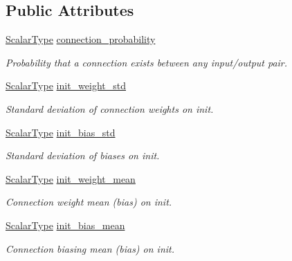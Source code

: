 \subsection*{Public Attributes}
\begin{DoxyCompactItemize}
\item 
\hyperlink{classffnn_1_1layer_1_1internal_1_1_interface_a7f834e3365e5199bcbcd16d9abd63941}{Scalar\-Type} \hyperlink{structffnn_1_1layer_1_1_sparsely_connected_1_1_parameters_a81458846f7bd4ebdfd0b630cfecd7df0}{connection\-\_\-probability}
\begin{DoxyCompactList}\small\item\em Probability that a connection exists between any input/output pair. \end{DoxyCompactList}\item 
\hyperlink{classffnn_1_1layer_1_1internal_1_1_interface_a7f834e3365e5199bcbcd16d9abd63941}{Scalar\-Type} \hyperlink{structffnn_1_1layer_1_1_sparsely_connected_1_1_parameters_a50317b12cecff8ce1b6fa82874b28372}{init\-\_\-weight\-\_\-std}
\begin{DoxyCompactList}\small\item\em Standard deviation of connection weights on init. \end{DoxyCompactList}\item 
\hyperlink{classffnn_1_1layer_1_1internal_1_1_interface_a7f834e3365e5199bcbcd16d9abd63941}{Scalar\-Type} \hyperlink{structffnn_1_1layer_1_1_sparsely_connected_1_1_parameters_a1519128b112ea0cf4a4d021c363bb48c}{init\-\_\-bias\-\_\-std}
\begin{DoxyCompactList}\small\item\em Standard deviation of biases on init. \end{DoxyCompactList}\item 
\hyperlink{classffnn_1_1layer_1_1internal_1_1_interface_a7f834e3365e5199bcbcd16d9abd63941}{Scalar\-Type} \hyperlink{structffnn_1_1layer_1_1_sparsely_connected_1_1_parameters_a46e27cf05911e23f508a3447284fd3c7}{init\-\_\-weight\-\_\-mean}
\begin{DoxyCompactList}\small\item\em Connection weight mean (bias) on init. \end{DoxyCompactList}\item 
\hyperlink{classffnn_1_1layer_1_1internal_1_1_interface_a7f834e3365e5199bcbcd16d9abd63941}{Scalar\-Type} \hyperlink{structffnn_1_1layer_1_1_sparsely_connected_1_1_parameters_ad19efad752312f71c26108e882e53581}{init\-\_\-bias\-\_\-mean}
\begin{DoxyCompactList}\small\item\em Connection biasing mean (bias) on init. \end{DoxyCompactList}\end{DoxyCompactItemize}


